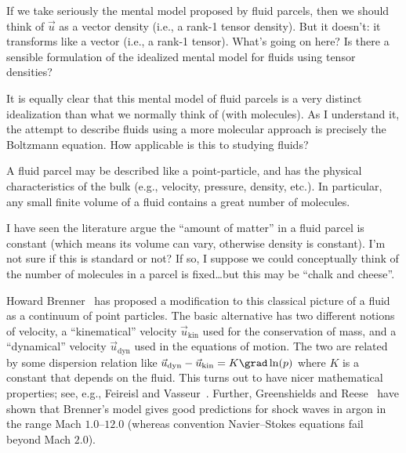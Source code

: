 \begin{node}
\begin{node}
\begin{puzzle}
If we take seriously the mental model proposed by fluid parcels, then we
should think of $\vec{u}$ as a vector density (i.e., a rank-1 tensor density). 
But it doesn't: it transforms like a vector (i.e., a rank-1 tensor).
What's going on here? Is there a sensible formulation of the idealized
mental model for fluids using tensor densities? 
\end{puzzle}

\begin{puzzle}
It is equally clear that this mental model of fluid parcels is a very
distinct idealization than what we normally think of (with molecules).
As I understand it, the attempt to describe fluids using a more
molecular approach is precisely the Boltzmann equation. How applicable
is this to studying fluids?
\end{puzzle}
\end{node} %

\begin{node}\label{fluids:describing-000A}%
A fluid parcel may be described like a point-particle, and has the
physical characteristics of the bulk (e.g., velocity, pressure, density,
etc.). In particular, any small finite volume of a fluid contains a
great number of molecules.

\begin{node}[Remark]\label{fluids:describing-000B}%
I have seen the literature argue the ``amount of matter'' in a fluid
parcel is constant (which means its volume can vary, otherwise density
is constant). I'm not sure if this is standard or not? If so, I suppose
we could conceptually think of the number of molecules in a parcel is
fixed\dots but this may be ``chalk and cheese''.
\end{node} %

\begin{node}\label{fluids:describing-000H}%
Howard Brenner~\cite{brenner2005kinematics,brenner2005navier,brenner2006fluid} has proposed a modification to this classical picture of
a fluid as a continuum of point particles. The basic alternative has two
different notions of velocity, a ``kinematical'' velocity
$\vec{u}_{\text{kin}}$ used for the conservation of mass, and a
``dynamical'' velocity $\vec{u}_{\text{dyn}}$ used in the equations
of motion. The two are related by some dispersion relation like
$\vec{u}_{\text{dyn}}-\vec{u}_{\text{kin}}=K\grad\ln(p)$ where $K$ is a
constant that depends on the fluid. This turns out to have nicer
mathematical properties; see, e.g., Feireisl and Vasseur~\cite{feireisl2010new}.
Further, Greenshields and Reese~\cite{greenshields2007structure} have
shown that Brenner's model gives good predictions for shock waves in
argon in the range Mach $1.0$--$12.0$ (whereas convention Navier--Stokes
equations fail beyond Mach $2.0$).
\end{node} %
\end{node} %


\end{node}
